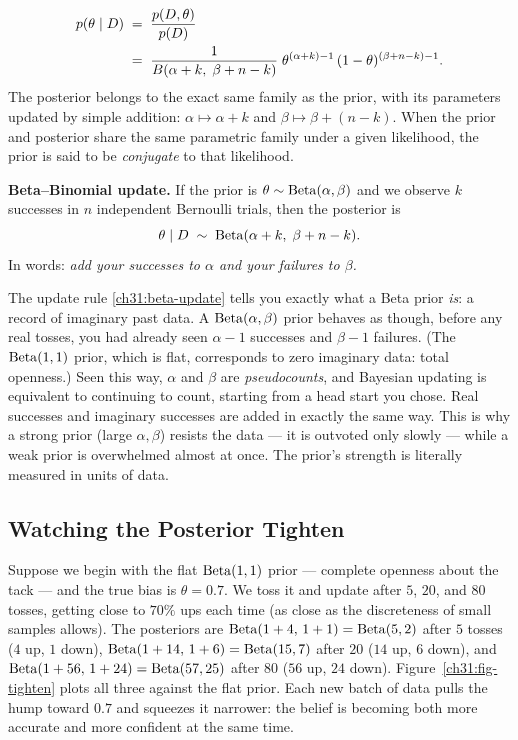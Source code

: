 \begin{align}
  p(\theta \mid D) &\;=\; \frac{p(D,\theta)}{p(D)} \nonumber \\
  &\;=\; \frac{1}{B(\alpha+k,\;\beta+n-k)}\;\theta^{(\alpha+k)-1}\,(1-\theta)^{(\beta+n-k)-1}.
  \label{ch31:beta-posterior-derivation}
\end{align}
The posterior belongs to the exact same family as the prior, with its parameters updated by simple addition: $\alpha \mapsto \alpha + k$ and $\beta \mapsto \beta + (n-k)$. When the prior and posterior share the same parametric family under a given likelihood, the prior is said to be \emph{conjugate} to that likelihood.

\begin{formalbox}
\textbf{Beta--Binomial update.} If the prior is $\theta \sim \operatorname{Beta}(\alpha,\beta)$ and we
observe $k$ successes in $n$ independent Bernoulli trials, then the posterior is
\begin{equation}
  \theta \mid D \;\sim\; \operatorname{Beta}(\alpha + k,\; \beta + n - k).
  \label{ch31:beta-update}
\end{equation}
In words: \emph{add your successes to $\alpha$ and your failures to $\beta$.}
\end{formalbox}

\begin{happeningbox}
The update rule \eqref{ch31:beta-update} tells you exactly what a Beta prior \emph{is}: a
record of imaginary past data. A $\operatorname{Beta}(\alpha,\beta)$ prior behaves as though, before any
real tosses, you had already seen $\alpha-1$ successes and $\beta-1$ failures. (The
$\operatorname{Beta}(1,1)$ prior, which is flat, corresponds to zero imaginary data: total openness.)
Seen this way, $\alpha$ and $\beta$ are \emph{pseudocounts}, and Bayesian updating is
equivalent to continuing to count, starting from a head start you chose. Real successes and
imaginary successes are added in exactly the same way. This is why a strong prior (large
$\alpha,\beta$) resists the data --- it is outvoted only slowly --- while a weak prior is
overwhelmed almost at once. The prior's strength is literally measured in units of data.
\end{happeningbox}

\subsection{Watching the Posterior Tighten}

Suppose we begin with the flat $\operatorname{Beta}(1,1)$ prior --- complete openness about the tack ---
and the true bias is $\theta = 0.7$. We toss it and update after $5$, $20$, and $80$
tosses, getting close to $70\%$ ups each time (as close as the discreteness of small
samples allows). The posteriors are
$\operatorname{Beta}(1+4,\,1+1)=\operatorname{Beta}(5,2)$ after $5$ tosses ($4$ up, $1$ down),
$\operatorname{Beta}(1+14,\,1+6)=\operatorname{Beta}(15,7)$ after $20$ ($14$ up, $6$ down), and
$\operatorname{Beta}(1+56,\,1+24)=\operatorname{Beta}(57,25)$ after $80$ ($56$ up, $24$ down). Figure~\ref{ch31:fig-tighten} plots all three
against the flat prior. Each new batch of data pulls the hump toward $0.7$ and squeezes it
narrower: the belief is becoming both more accurate and more confident at the same time.


